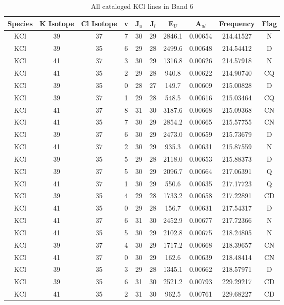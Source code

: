 \begin{table*}[htp]
\centering
\caption{All cataloged KCl lines in Band 6}
\begin{tabular}{cccccccccc}
\label{tab:K_detections_B6}
Species & K Isotope & Cl Isotope & v & J$_u$ & J$_l$ & E$_U$ & A$_{ul}$ & Frequency & Flag \\
\hline
KCl & 39 & 37 & 7 & 30 & 29 & 2846.1 & 0.00654 & 214.41527 & N \\
KCl & 39 & 35 & 6 & 29 & 28 & 2499.6 & 0.00648 & 214.54412 & D \\
KCl & 41 & 37 & 3 & 30 & 29 & 1316.8 & 0.00626 & 214.57918 & N \\
KCl & 41 & 35 & 2 & 29 & 28 & 940.8 & 0.00622 & 214.90740 & CQ \\
KCl & 39 & 35 & 0 & 28 & 27 & 149.7 & 0.00609 & 215.00828 & D \\
KCl & 39 & 37 & 1 & 29 & 28 & 548.5 & 0.00616 & 215.03464 & CQ \\
KCl & 41 & 37 & 8 & 31 & 30 & 3187.6 & 0.00668 & 215.09368 & CN \\
KCl & 41 & 35 & 7 & 30 & 29 & 2854.2 & 0.00665 & 215.57755 & CN \\
KCl & 39 & 37 & 6 & 30 & 29 & 2473.0 & 0.00659 & 215.73679 & D \\
KCl & 41 & 37 & 2 & 30 & 29 & 935.3 & 0.00631 & 215.87559 & N \\
KCl & 39 & 35 & 5 & 29 & 28 & 2118.0 & 0.00653 & 215.88373 & D \\
KCl & 39 & 37 & 5 & 30 & 29 & 2096.7 & 0.00664 & 217.06391 & Q \\
KCl & 41 & 37 & 1 & 30 & 29 & 550.6 & 0.00635 & 217.17723 & Q \\
KCl & 39 & 35 & 4 & 29 & 28 & 1733.2 & 0.00658 & 217.22891 & CD \\
KCl & 41 & 35 & 0 & 29 & 28 & 156.7 & 0.00631 & 217.54317 & D \\
KCl & 41 & 37 & 6 & 31 & 30 & 2452.9 & 0.00677 & 217.72366 & N \\
KCl & 41 & 35 & 5 & 30 & 29 & 2102.8 & 0.00675 & 218.24805 & N \\
KCl & 39 & 37 & 4 & 30 & 29 & 1717.2 & 0.00668 & 218.39657 & CN \\
KCl & 41 & 37 & 0 & 30 & 29 & 162.6 & 0.00639 & 218.48414 & CN \\
KCl & 39 & 35 & 3 & 29 & 28 & 1345.1 & 0.00662 & 218.57971 & D \\
KCl & 39 & 35 & 6 & 31 & 30 & 2521.2 & 0.00793 & 229.29217 & CD \\
KCl & 41 & 35 & 2 & 31 & 30 & 962.5 & 0.00761 & 229.68227 & CD \\

\end{tabular}
\end{table*}

